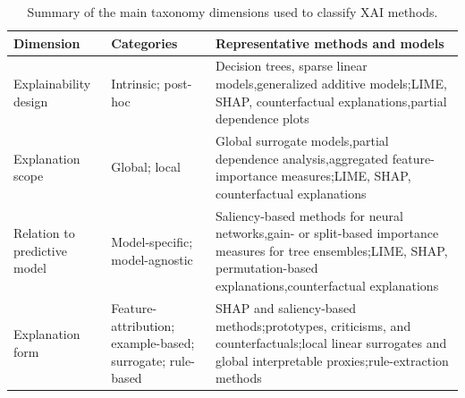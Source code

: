 \begin{table}[H]
\centering
\renewcommand{\arraystretch}{1.18}
\caption{Summary of the main taxonomy dimensions used to classify XAI methods.}
\label{tab:xai-taxonomy-summary}
\begin{tabular}{>{\raggedright\arraybackslash}p{} >{\raggedright\arraybackslash}p{} >{\raggedright\arraybackslash}p{}}
  \toprule
  \textbf{Dimension} & \textbf{Categories} & \textbf{Representative methods and models} \\
  \midrule
  Explainability design & Intrinsic; post-hoc & Decision trees, sparse linear models,\newline generalized additive models;\newline LIME, SHAP, counterfactual explanations,\newline partial dependence plots \\
  Explanation scope & Global; local & Global surrogate models,\newline partial dependence analysis,\newline aggregated feature-importance measures;\newline LIME, SHAP, counterfactual explanations \\
  Relation to predictive model & Model-specific; model-agnostic & Saliency-based methods for neural networks,\newline gain- or split-based importance measures for tree ensembles;\newline LIME, SHAP, permutation-based explanations,\newline counterfactual explanations \\
  Explanation form & Feature-attribution; example-based; surrogate; rule-based & SHAP and saliency-based methods;\newline prototypes, criticisms, and counterfactuals;\newline local linear surrogates and global interpretable proxies;\newline rule-extraction methods \\
  \bottomrule
\end{tabular}
\renewcommand{\arraystretch}{1.0}
\end{table}


